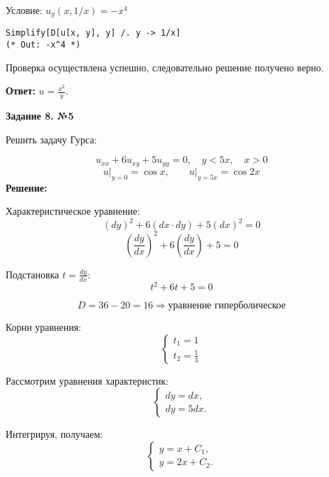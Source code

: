 \documentclass[a4paper,12pt]{article}
\begin{document}
Условие: \( u_y(x, 1/x) = -x^4 \)

\begin{lstlisting}[style=wolfram]
Simplify[D[u[x, y], y] /. y -> 1/x]
(* Out: -x^4 *)
\end{lstlisting}

Проверка осуществлена успешно, следовательно решение получено верно.

\textbf{Ответ:} $u =\frac{x^2}{y}$.

\begin{center}    
    \textbf{Задание 8. №5}
\end{center}

Решить задачу Гурса:

\begin{equation*}
    u_{xx} + 6 u_{xy} + 5u_{yy} = 0, \quad y<5x, \quad  x>0
\end{equation*}
\[
u \Big|_{y=0} = \cos x, \quad \quad  u \Big|_{y=5x} = \cos 2x
\]
\textbf{Решение:}

Характеристическое уравнение:
\begin{equation*}
     (dy)^2 + 6 (dx \cdot dy) + 5(dx)^2=0
\end{equation*}
\begin{equation*}
\left( \frac{dy}{dx} \right)^2 + 6 \left( \frac{dy}{dx} \right) + 5=0
\end{equation*}

Подстановка $t = \frac{dy}{dx}$:
\begin{equation*}
    t^2 + 6 t + 5=0
\end{equation*}

\begin{equation*}
    D = 36 - 20 = 16 \Rightarrow \text{уравнение гиперболическое}
\end{equation*}

Корни уравнения:
\begin{equation*}
    \begin{cases}
    t_1 = 1 \\
    t_2 = \frac{1}{3}
    \end{cases}
\end{equation*}

Рассмотрим уравнения характеристик:
\[
\begin{cases}
    dy = dx, \\
    dy = 5dx.
\end{cases}
\]

Интегрируя, получаем:
\[
\begin{cases}
    y = x + C_1, \\
    y = 2x + C_2.
\end{cases}
\]
\end{document}
